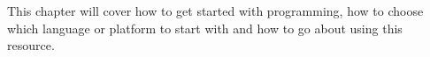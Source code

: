 This chapter will cover how to get started with programming, how to choose which language or platform to start with and how to go about
using this resource.
\pagebreak
